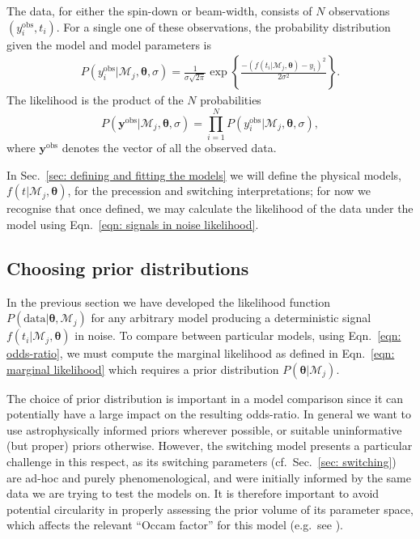 \documentclass[../full_thesis/full_thesis.tex]{subfiles}
\newcommand{\M}{\mathcal{M}}
\newcommand{\data}{\textrm{data}}
\newcommand{\params}{\boldsymbol{\theta}}
\newcommand{\yobs}{y^{\textrm{obs}}}
\newcommand{\ydata}{\mathbf{y}^{\mathrm{obs}}}
\begin{document}
The data, for either the spin-down or beam-width, consists of $N$ observations
$(\yobs_{i}, t_{i})$. For a
single one of these observations,
the probability distribution given the model and model parameters is
\begin{align}
P(y_{i}^{\textrm{obs}}| \M_j, \params, \sigma) =
\frac{1}{\sigma\sqrt{2\pi}}
\exp\left\{\frac{-\left(f(t_{i}|\M_j, \params)
            - y_{i}\right)^{2}}{2\sigma^{2}}\right\}.
\end{align}
The likelihood is the product of the $N$ probabilities
\begin{equation}
P(\ydata| \M_{j}, \params, \sigma) =
              \prod_{i=1}^{N} P(y_{i}^{\textrm{obs}}|\M_{j}, \params, \sigma),
\label{eqn: signals in noise likelihood}
\end{equation}
where $\ydata$ denotes the vector of all the observed data.

In Sec.~\ref{sec: defining and fitting the models} we will define the physical
models, $f(t| \M_j, \params)$, for the precession and
switching interpretations; for now we recognise that once defined, we may
calculate the likelihood of the data under the model using Eqn.~\eqref{eqn:
signals in noise likelihood}.

\subsection{Choosing prior distributions}
\label{sec: setting prior distributions}

In the previous section we have developed the likelihood function $P(\data|
\params, \M_{j})$ for any arbitrary model producing a deterministic signal
$f(t_{i}|\M_j, \params)$ in noise. To compare between particular models, using
Eqn.~\eqref{eqn: odds-ratio}, we must compute the marginal likelihood as
defined in Eqn.~\eqref{eqn: marginal likelihood} which requires a prior
distribution $P(\params|\M_{j})$.

The choice of prior distribution is important in a model comparison since it
can potentially have a large impact on the resulting odds-ratio.  In general we
want to use astrophysically informed priors wherever possible, or suitable
uninformative (but proper) priors otherwise. However, the switching model
presents a particular challenge in this respect, as its switching parameters
(cf.\ Sec.~\ref{sec: switching}) are ad-hoc and purely phenomenological, and
were initially informed by the same data we are trying to test the models on.
It is therefore important to avoid potential circularity in properly assessing
the prior volume of its parameter space, which affects the relevant ``Occam
factor'' for this model (e.g.\ see \citet{mackay2003information}).
\end{document}
